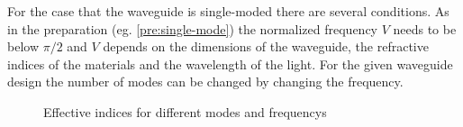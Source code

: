 For the case that the waveguide is single-moded there are several conditions. As in the preparation (eg. \ref{pre:single-mode}) the normalized frequency $V$ needs to be below $\pi/2$ and $V$ depends on the dimensions of the waveguide, the refractive indices of the materials and the wavelength of the light.
For the given waveguide design the number of modes can be changed by changing the frequency. 
\begin{figure}[ht]%
\centering
\caption{Effective indices for different modes and frequencys}%
\label{fig:2_sweep}%
\end{figure}

